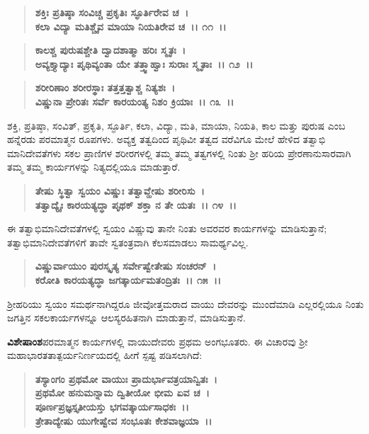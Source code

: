 \begin{verse}
\textbf{ಶಕ್ತಿಃ ಪ್ರತಿಷ್ಠಾ ಸಂವಿಚ್ಚ ಪ್ರಕೃತಿಃ ಸ್ಫೂರ್ತಿರೇವ ಚ~।}\\\textbf{ಕಲಾ ವಿದ್ಯಾ ಮತಿಶ್ಚೈವ ಮಾಯಾ ನಿಯತಿರೇವ ಚ~।। ೧೧~।। }
\end{verse}

\begin{verse}
\textbf{ಕಾಲಶ್ಚ ಪುರುಷಶ್ಚೇತಿ ದ್ವಾದಶಾತ್ಮಾ ಹರಿಃ ಸ್ಮೃತಃ~।}\\\textbf{ಅವ್ಯಕ್ತ್ಯಾದ್ಯಾಃ ಪೃಥಿವ್ಯಂತಾ ಯೇ ತತ್ತ್ವಾಹ್ವಾಃ ಸುರಾಃ ಸ್ಮೃತಾಃ~।। ೧೨~।।}
\end{verse}

\begin{verse}
\textbf{ಶರೀರಿಣಾಂ ಶರೀರಸ್ಥಾಃ ತತ್ತತ್ತತ್ವಾಶ್ಚ ನಿತ್ಯಶಃ~।}\\\textbf{ವಿಷ್ಣುನಾ ಪ್ರೇರಿತಃ ಸರ್ವೆ ಕಾರಯಂತ್ಯ ನಿಶಂ ಕ್ರಿಯಾಃ~।। ೧೩~।।}
\end{verse}

ಶಕ್ತಿ, ಪ್ರತಿಷ್ಠಾ, ಸಂವಿತ್, ಪ್ರಕೃತಿ, ಸ್ಫೂರ್ತಿ, ಕಲಾ, ವಿದ್ಯಾ, ಮತಿ, ಮಾಯಾ, ನಿಯತಿ, ಕಾಲ ಮತ್ತು ಪುರುಷ ಎಂಬ ಹನ್ನೆರಡು ಪರಮಾತ್ಮನ ರೂಪಗಳು. ಅವ್ಯಕ್ತ ತತ್ವದಿಂದ ಪೃಥಿವೀ ತತ್ವದ ವರೆವಿಗೂ ಮೇಲೆ ಹೇಳಿದ ತತ್ವಾಭಿ ಮಾನಿದೇವತೆಗಳು ಸಕಲ ಪ್ರಾಣಿಗಳ ಶರೀರಗಳಲ್ಲಿ ತಮ್ಮ ತಮ್ಮ ತತ್ವಗಳಲ್ಲಿ ನಿಂತು ಶ‍್ರೀ ಹರಿಯ ಪ್ರೇರಣಾನುಸಾರವಾಗಿ ತಮ್ಮ ತಮ್ಮ ಕಾರ್ಯಗಳನ್ನು ನಿತ್ಯದಲ್ಲಿಯೂ ಮಾಡುತ್ತಾರೆ.

\begin{verse}
\textbf{ತೇಷು ಸ್ಥಿತ್ವಾ ಸ್ವಯಂ ವಿಷ್ಣುಃ ತತ್ವಾವ್ಹೇಷು ಶರೀರಿಸು~।}\\\textbf{ತತ್ವಾದ್ಯೈಃ ಕಾರಯತ್ಯದ್ಧಾ ಪೃಥಕ್ ಶಕ್ತಾ ನ ತೇ ಯತಃ~।। ೧೪~।।}
\end{verse}

ಈ ತತ್ವಾಭಿಮಾನಿದೇವತೆಗಳಲ್ಲಿ ಸ್ವಯಂ ವಿಷ್ಣುವು ತಾನೇ ನಿಂತು ಅವರವರ ಕಾರ್ಯಗಳನ್ನು ಮಾಡಿಸುತ್ತಾನೆ; ತತ್ವಾಭಿಮಾನಿದೇವತೆಗಳಿಗೆ ತಾವೇ ಸ್ವತಂತ್ರವಾಗಿ ಕೆಲಸಮಾಡಲು ಸಾಮರ್ಥ್ಯವಿಲ್ಲ.

\begin{verse}
\textbf{ವಿಷ್ಣುರ್ವಾಯುಂ ಪುರಸ್ಕೃತ್ಯ ಸರ್ವೇಷ್ವೇತೇಷು ಸಂಚರನ್~।}\\\textbf{ಕರೋತಿ ಕಾರಯತ್ಯದ್ಧಾ ಜಗತ್ಕಾರ್ಯಮತಂದ್ರಿತಃ~।। ೧೫~।।}
\end{verse}

ಶ‍್ರೀಹರಿಯು ಸ್ವಯಂ ಸಮರ್ಥನಾಗಿದ್ದರೂ ಜೀವೋತ್ತಮರಾದ ವಾಯು ದೇವರನ್ನು ಮುಂದೆಮಾಡಿ ಎಲ್ಲರಲ್ಲಿಯೂ ನಿಂತು ಜಗತ್ತಿನ ಸಕಲಕಾರ್ಯಗಳನ್ನೂ ಆಲಸ್ಯರಹಿತನಾಗಿ ಮಾಡುತ್ತಾನೆ, ಮಾಡಿಸುತ್ತಾನೆ.

\textbf{ವಿಶೇಷಾಂಶ}ಪರಮಾತ್ಮನ ಕಾರ್ಯಗಳಲ್ಲಿ ವಾಯುದೇವರು ಪ್ರಥಮ ಅಂಗಭೂತರು. ಈ ವಿಚಾರವು ಶ‍್ರೀ ಮಹಾಭಾರತತಾತ್ಪರ್ಯನಿರ್ಣಯದಲ್ಲಿ ಹೀಗೆ ಸ್ಪಷ್ಟ ಪಡಿಸಲಾಗಿದೆ:

\begin{verse}
\textbf{ತಸ್ಯಾಂಗಂ ಪ್ರಥಮೋ ವಾಯುಃ ಪ್ರಾದುರ್ಭಾವತ್ರಯಾನ್ವಿತಃ~।}\\\textbf{ಪ್ರಥಮೋ ಹನುಮನ್ನಾಮ ದ್ವಿತೀಯೋ ಭೀಮ ಏವ ಚ~। }\\\textbf{ಪೂರ್ಣಪ್ರಜ್ಞಸ್ತೃತೀಯಸ್ತು ಭಗವತ್ಕಾರ್ಯಸಾಧಕಃ~।।} \\\textbf{ತ್ರೇತಾದ್ಯೇಷು ಯುಗೇಷ್ವೇವ ಸಂಭೂತಃ ಕೇಶವಾಜ್ಞಯಾ~।।}
\end{verse}


